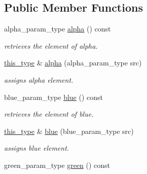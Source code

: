 \subsection*{Public Member Functions}
\begin{DoxyCompactItemize}
\item 
\hypertarget{classhryky_1_1color_1_1_rgba_a348c8dd4c3dd8fb08d6748a7d62dcf12}{alpha\-\_\-param\-\_\-type \hyperlink{classhryky_1_1color_1_1_rgba_a348c8dd4c3dd8fb08d6748a7d62dcf12}{alpha} () const }\label{classhryky_1_1color_1_1_rgba_a348c8dd4c3dd8fb08d6748a7d62dcf12}

\begin{DoxyCompactList}\small\item\em retrieves the element of alpha. \end{DoxyCompactList}\item 
\hypertarget{classhryky_1_1color_1_1_rgba_a3c8f1fac36f01119a27273e513a7bd6d}{\hyperlink{classhryky_1_1color_1_1_rgba_a6ffc48e44b20a791c6bd35bf637a54ad}{this\-\_\-type} \& \hyperlink{classhryky_1_1color_1_1_rgba_a3c8f1fac36f01119a27273e513a7bd6d}{alpha} (alpha\-\_\-param\-\_\-type src)}\label{classhryky_1_1color_1_1_rgba_a3c8f1fac36f01119a27273e513a7bd6d}

\begin{DoxyCompactList}\small\item\em assigns alpha element. \end{DoxyCompactList}\item 
\hypertarget{classhryky_1_1color_1_1_rgba_a31f7a7232ee91a12615da162adae7120}{blue\-\_\-param\-\_\-type \hyperlink{classhryky_1_1color_1_1_rgba_a31f7a7232ee91a12615da162adae7120}{blue} () const }\label{classhryky_1_1color_1_1_rgba_a31f7a7232ee91a12615da162adae7120}

\begin{DoxyCompactList}\small\item\em retrieves the element of blue. \end{DoxyCompactList}\item 
\hypertarget{classhryky_1_1color_1_1_rgba_a2b3aa67be7a38781b97c7f9d52b10c08}{\hyperlink{classhryky_1_1color_1_1_rgba_a6ffc48e44b20a791c6bd35bf637a54ad}{this\-\_\-type} \& \hyperlink{classhryky_1_1color_1_1_rgba_a2b3aa67be7a38781b97c7f9d52b10c08}{blue} (blue\-\_\-param\-\_\-type src)}\label{classhryky_1_1color_1_1_rgba_a2b3aa67be7a38781b97c7f9d52b10c08}

\begin{DoxyCompactList}\small\item\em assigns blue element. \end{DoxyCompactList}\item 
\hypertarget{classhryky_1_1color_1_1_rgba_a95b3fc0f8f305b52849c26de0c2ef717}{green\-\_\-param\-\_\-type \hyperlink{classhryky_1_1color_1_1_rgba_a95b3fc0f8f305b52849c26de0c2ef717}{green} () const }\label{classhryky_1_1color_1_1_rgba_a95b3fc0f8f305b52849c26de0c2ef717}


\end{DoxyCompactItemize}

